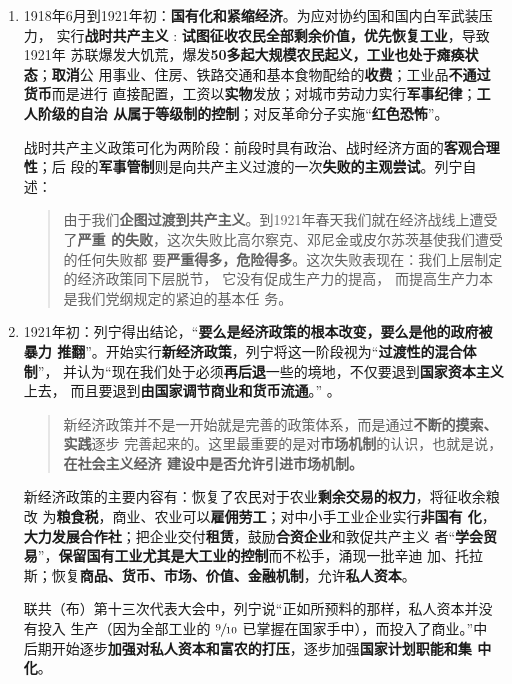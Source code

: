 \begin{enumerate}
\item 1918年6月到1921年初：\textbf{国有化和紧缩经济}。为应对协约国和国内白军武装压力，
  实行\textbf{战时共产主义} : \textbf{试图征收农民全部剩余价值，优先恢复工业}，导致1921年
  苏联爆发大饥荒，爆发\textbf{50多起大规模农民起义，工业也处于瘫痪状态}；\textbf{取消}公
  用事业、住房、铁路交通和基本食物配给的\textbf{收费}；工业品\textbf{不通过货币}而是进行
  直接配置，工资以\textbf{实物}发放；对城市劳动力实行\textbf{军事纪律}；\textbf{工人阶级的自治
    从属于等级制的控制}；对反革命分子实施“\textbf{红色恐怖}”。

  战时共产主义政策可化为两阶段：前段时具有政治、战时经济方面的\textbf{客观合理性}；后
  段的\textbf{军事管制}则是向共产主义过渡的一次\textbf{失败的主观尝试}。列宁自述：
  \begin{quotation}
    由于我们\textbf{企图过渡到共产主义}。到1921年春天我们就在经济战线上遭受了\textbf{严重
      的失败}，这次失败比高尔察克、邓尼金或皮尔苏茨基使我们遭受的任何失败都
    要\textbf{严重得多，危险得多}。这次失败表现在：我们上层制定的经济政策同下层脱节，
    它没有促成生产力的提高， 而提高生产力本是我们党纲规定的紧迫的基本任
    务。\cite[184]{lenin42}
  \end{quotation}

\item 1921年初：列宁得出结论，“\textbf{要么是经济政策的根本改变，要么是他的政府被暴力
    推翻}”。开始实行\textbf{新经济政策}，列宁将这一阶段视为“\textbf{过渡性的混合体制}”，
  并认为“现在我们处于必须\textbf{再后退}一些的境地，不仅要退到\textbf{国家资本主义}上去，
  而且要退到\textbf{由国家调节商业和货币流通}。”\cite[283]{leninlunshe} 。


  \begin{quotation}
    新经济政策并不是一开始就是完善的政策体系，而是通过\textbf{不断的摸索、实践}逐步
    完善起来的。这里最重要的是对\textbf{市场机制}的认识，也就是说，\textbf{在社会主义经济
      建设中是否允许引进市场机制。}\cite[144-145]{bigrussia}
  \end{quotation}

  新经济政策的主要内容有：恢复了农民对于农业\textbf{剩余交易的权力}，将征收余粮改
  为\textbf{粮食税}，商业、农业可以\textbf{雇佣劳工}；对中小手工业企业实行\textbf{非国有
    化}，\textbf{大力发展合作社}；把企业交付\textbf{租赁}，鼓励\textbf{合资企业}和敦促共产主义
  者“\textbf{学会贸易}”，\textbf{保留国有工业尤其是大工业的控制}而不松手，涌现一批辛迪
  加、托拉斯；恢复\textbf{商品、货币、市场、价值、金融机制}，允许\textbf{私人资本}。

  联共（布）第十三次代表大会中，列宁说“正如所预料的那样，私人资本并没有投入
  生产（因为全部工业的 $\sfrac{9}{10}$ 已掌握在国家手中），而投入了商业。”中
  后期开始逐步\textbf{加强对私人资本和富农的打压}，逐步加强\textbf{国家计划职能和集
    中化}。


\end{enumerate}
